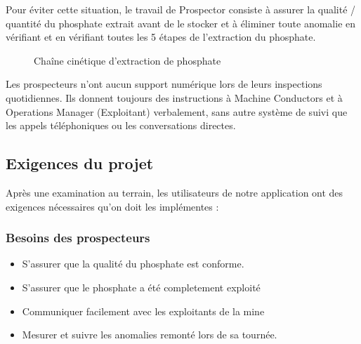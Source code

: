 Pour \'eviter cette situation, le travail de Prospector consiste \`a assurer la qualit\'e / quantit\'e du phosphate extrait avant de le stocker et \`a \'eliminer toute anomalie en v\'erifiant et en v\'erifiant toutes les 5 \'etapes de l'extraction du phosphate.

\begin{figure}[!htb]
	\caption{\label{fig:my-label} Cha\^ine cin\'etique d'extraction de phosphate}
\end{figure}

Les prospecteurs n'ont aucun support num\'erique lors de leurs inspections quotidiennes. Ils donnent toujours des instructions \`a Machine Conductors et \`a Operations Manager (Exploitant) verbalement, sans autre syst\`eme de suivi que les appels t\'el\'ephoniques ou les conversations directes.

{\color{red}{Comment pouvons-nous aider les prospecteurs \`a relever et \`a garder trace des anomalies au cours de leur inspection quotidienne pour \'eviter les souillures au phosphate?}}

\subsection{Exigences du projet}
Apr\`es une examination au terrain, les utilisateurs de notre application ont des exigences n\'ecessaires qu'on doit les impl\'ementes :
\subsubsection{Besoins des prospecteurs}
\begin{itemize}
\item S'assurer que la qualit\'e du phosphate est conforme.
\item S'assurer que le phosphate a \'et\'e completement exploit\'e
\item Communiquer facilement avec les exploitants de la mine
\item Mesurer et suivre les anomalies remont\'e lors de sa tourn\'ee.
\end{itemize}
